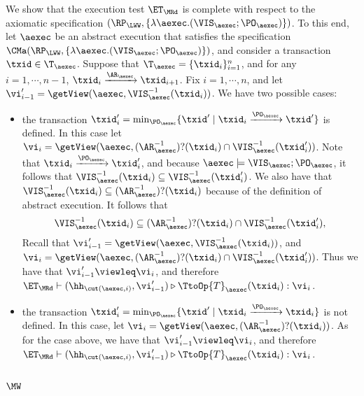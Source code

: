 We show that the execution test $\ET_{\MRd}$ is complete 
with respect to the axiomatic specification $(\RP_{\LWW}, \{\lambda \aexec.(\VIS_{\aexec};\PO_{\aexec})\})$. 
To this end, let $\aexec$ be an abstract execution that satisfies the specification
$\CMa(\RP_{\LWW}, \{\lambda \aexec.(\VIS_{\aexec};\PO_{\aexec})\})$, 
and consider a transaction $\txid \in \T_{\aexec}$. 
Suppose that $\T_{\aexec} = \{\txid_{i}\}_{i=1}^{n}$, and for any $i=1,\cdots, n-1$,
$\txid_{i} \xrightarrow{\AR_{\aexec}} \txid_{i+1}$.
Fix $i=1,\cdots,n$, and let $\vi'_{i-1} = \getView(\aexec, \VIS^{-1}_{\aexec}(\txid_{i}))$.
We have two possible cases: 
\begin{itemize}
\item the transaction $\txid'_{i} = \min_{\PO_{\aexec}}\{\txid' \mid \txid_{i} \xrightarrow{\PO_{\aexec}} \txid'\}$ is 
defined. In this case let $\vi_{i} =\getView(\aexec, (\AR^{-1}_{\aexec})?(\txid_{i}) \cap \VIS^{-1}_{\aexec}(\txid'_{i}))$. 
Note that $\txid_{i} \xrightarrow{\PO_{\aexec}} \txid'_{i}$, and because $\aexec \models \VIS_{\aexec} ; \PO_{\aexec}$, 
it follows that $\VIS^{-1}_{\aexec}(\txid_{i}) \subseteq \VIS^{-1}_{\aexec}(\txid'_{i})$. 
We also have that $\VIS^{-1}_{\aexec}(\txid_{i}) \subseteq (\AR^{-1}_{\aexec})?(\txid_{i})$ because of 
the definition of abstract execution. It follows that 
\[
\VIS^{-1}_{\aexec}(\txid_{i}) \subseteq (\AR^{-1}_{\aexec})?(\txid_{i}) \cap \VIS^{-1}_{\aexec}(\txid'_{i}),
\]
Recall that  $\vi'_{i-1} = \getView(\aexec, \VIS^{-1}_{\aexec}(\txid_{i}))$, 
and $\vi_{i} =\getView(\aexec, (\AR^{-1}_{\aexec})?(\txid_{i}) \cap \VIS^{-1}_{\aexec}(\txid'_{i}))$. 
Thus we have that $\vi'_{i-1} \viewleq \vi_{i}$, and therefore $\ET_{\MRd} \vdash (\hh_{\cut(\aexec, i)}, \vi'_{i-1}) 
\triangleright \TtoOp{T}_{\aexec}(\txid_{i}) : \vi_{i}$. 
\item the transaction $\txid'_{i} = \min_{\PO_{\aexec}}\{\txid' \mid \txid_{i} \xrightarrow{\PO_{\aexec}} \txid_{i}\}$ 
is not defined. In this case, let $\vi_{i} = \getView(\aexec, (\AR^{-1}_{\aexec})?(\txid_{i}))$. 
As for the case above, we have that $\vi'_{i-1} \viewleq \vi_{i}$, and therefore 
$\ET_{\MRd} \vdash (\hh_{\cut(\aexec, i)}, \vi'_{i-1}) \triangleright \TtoOp{T}_{\aexec}(\txid_{i}) : \vi_{i}$. 
\end{itemize}

\subsection{\( \MW \)}

\label{sec:sound-complete-mw}

